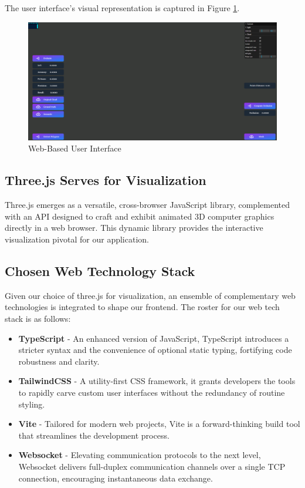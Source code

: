 \documentclass[11pt, a4paper,oneside,chapterprefix=false]{scrbook}
\begin{document}
\vspace{10pt}

The user interface's visual representation is captured in Figure \ref{fig:web user interface}.

\begin{figure}[H]
	\centering
	\includegraphics*[width=1.0\textwidth]{figures/ui.png}
	\caption{Web-Based User Interface}
	\label{fig:web user interface}
\end{figure}

\subsection{Three.js Serves for Visualization}

Three.js emerges as a versatile, cross-browser JavaScript library, complemented with an API designed to craft and exhibit animated 3D computer graphics directly in a web browser. This dynamic library provides the interactive visualization pivotal for our application.

\subsection{Chosen Web Technology Stack}

Given our choice of three.js for visualization, an ensemble of complementary web technologies is integrated to shape our frontend. The roster for our web tech stack is as follows:

\begin{itemize}
	\item \textbf{TypeScript} - An enhanced version of JavaScript, TypeScript introduces a stricter syntax and the convenience of optional static typing, fortifying code robustness and clarity.
	
	\item \textbf{TailwindCSS} - A utility-first CSS framework, it grants developers the tools to rapidly carve custom user interfaces without the redundancy of routine styling.
	
	\item \textbf{Vite} - Tailored for modern web projects, Vite is a forward-thinking build tool that streamlines the development process.
	
	\item \textbf{Websocket} - Elevating communication protocols to the next level, Websocket delivers full-duplex communication channels over a single TCP connection, encouraging instantaneous data exchange.
\end{itemize}
\end{document}
